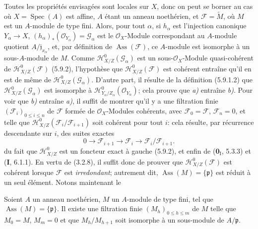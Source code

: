 Toutes les propriétés envisagées sont locales sur $X$, donc on peut se borner
au cas où $X=\operatorname{Spec}(A)$ est affine, $A$ étant un anneau
noethérien, et $\mathcal F=\widetilde M$, où $M$ est un $A$-module de type
fini. Alors, pour tout $\alpha$, si $h_\alpha$ est l'injection canonique
$Y_\alpha\to X$, $(h_\alpha)_*(\mathcal O_{Y_\alpha})=\mathcal G_\alpha$ est
le $\mathcal O_X$-Module correspondant au $A$-module quotient
$A/\mathfrak j_{x_\alpha}$, et, par définition de
$\operatorname{Ass}(\mathcal F)$, ce $A$-module est isomorphe à un
sous-$A$-module de $M$. Comme $\mathcal H^0_{X/Z}(\mathcal G_\alpha)$ est un
sous-$\mathcal O_X$-Module quasi-cohérent de
$\mathcal H^0_{X/Z}(\mathcal F)$ (5.9.2), l'hypothèse que
$\mathcal H^0_{X/Z}(\mathcal F)$ est cohérent entraîne qu'il en est de même de
$\mathcal H^0_{X/Z}(\mathcal G_\alpha)$. D'autre part, il résulte de la
définition (5.9.1.2) que $\mathcal H^0_{X/Z}(\mathcal G_\alpha)$ est
isomorphe à
$\mathcal H^0_{Y_\alpha/Z_\alpha}(\mathcal O_{Y_\alpha})$;
cela prouve que \emph{a)} entraîne \emph{b)}. Pour voir que \emph{b)} entraîne \emph{a)}, il suffit de
montrer qu'il y a une filtration finie $(\mathcal F_i)_{0\leq i\leq n}$ de
$\mathcal F$ formée de $\mathcal O_X$-Modules cohérents, avec
$\mathcal F_0=\mathcal F$, $\mathcal F_n=0$, et telle que
$\mathcal H^0_{X/Z}(\mathcal F_i/\mathcal F_{i+1})$ soit cohérent pour tout
$i$: cela résulte, par récurrence descendante sur $i$, des suites exactes
\[
0\longrightarrow\mathcal F_{i+1}\longrightarrow\mathcal F_i
\longrightarrow\mathcal F_i/\mathcal F_{i+1}.
\]
du fait que $\mathcal H^0_{X/Z}$ est un foncteur exact à gauche (5.9.2), et
enfin de (\textbf{0}$_\mathrm I$, 5.3.3) et (\textbf{I}, 6.1.1). En vertu de (3.2.8), il suffit
donc de prouver que $\mathcal H^0_{X/Z}(\mathcal F)$ est cohérent lorsque
$\mathcal F$ est \emph{irredondant}; autrement dit,
$\operatorname{Ass}(M)=\{\mathfrak p\}$ est réduit à un seul élément. Notons
maintenant le

\begin{lemma}[5.11.1.1]
\label{IV.2.s5.11.1.1-fr}
Soient $A$ un anneau noethérien, $M$ un $A$-module de type fini, tel que
$\operatorname{Ass}(M)=\{\mathfrak p\}$. Il existe une filtration finie
$(M_h)_{0\leq h\leq m}$ de $M$ telle que $M_0=M$, $M_m=0$ et que
$M_h/M_{h+1}$ soit isomorphe à un sous-module de $A/\mathfrak p$.
\end{lemma}

